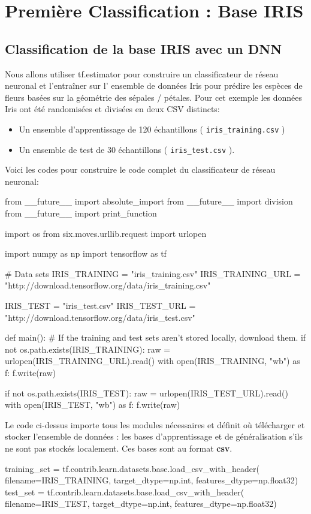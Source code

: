 \documentclass[a4paper,11pt]{book}
\theoremstyle{theo}
\begin{document}
\chapter{Première Classification : Base IRIS}
\section{ Classification de la base IRIS avec un DNN }
Nous  allons utiliser  tf.estimator  pour construire un classificateur de réseau neuronal et l'entraîner sur l' ensemble de données Iris pour prédire les espèces de fleurs basées sur la géométrie des sépales / pétales. Pour cet exemple  les données Iris ont été randomisées et divisées en deux CSV distincts:
\begin {itemize}
\item Un ensemble d'apprentissage de 120 échantillons ( \verb+iris_training.csv+ )
\item	Un ensemble de test de 30 échantillons ( \verb+iris_test.csv+ ).
\end{itemize}
 Voici les  codes pour construire le code complet  du classificateur de réseau neuronal:
\begin{mypython}
from __future__ import absolute_import
from __future__ import division
from __future__ import print_function

import os
from six.moves.urllib.request import urlopen

import numpy as np
import tensorflow as tf

# Data sets
IRIS_TRAINING = "iris_training.csv"
IRIS_TRAINING_URL = "http://download.tensorflow.org/data/iris_training.csv"

IRIS_TEST = "iris_test.csv"
IRIS_TEST_URL = "http://download.tensorflow.org/data/iris_test.csv"

def main():
  # If the training and test sets aren't stored locally, download them.
  if not os.path.exists(IRIS_TRAINING):
    raw = urlopen(IRIS_TRAINING_URL).read()
    with open(IRIS_TRAINING, "wb") as f:
      f.write(raw)

  if not os.path.exists(IRIS_TEST):
    raw = urlopen(IRIS_TEST_URL).read()
    with open(IRIS_TEST, "wb") as f:
      f.write(raw)
\end{mypython}
Le code ci-dessus importe  tous les modules nécessaires et définit où télécharger et stocker l'ensemble de données : les bases d'apprentissage et de généralisation s'ils ne sont pas stockés localement.
Ces bases sont au format \textbf{csv}.
\begin{mypython}
training_set = tf.contrib.learn.datasets.base.load_csv_with_header(
      filename=IRIS_TRAINING,
      target_dtype=np.int,
      features_dtype=np.float32)
test_set = tf.contrib.learn.datasets.base.load_csv_with_header(
      filename=IRIS_TEST,
      target_dtype=np.int,
      features_dtype=np.float32)
\end{mypython}
\end{document}
